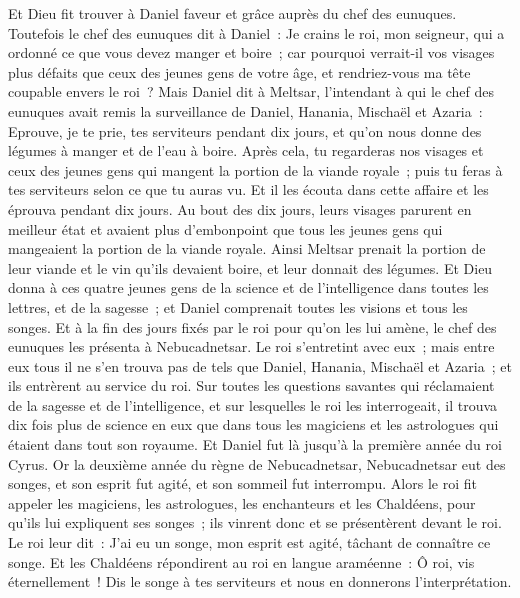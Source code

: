 \begin{multicols}{2}
Et Dieu fit trouver à Daniel faveur et grâce auprès du chef des eunuques. 
Toutefois le chef des eunuques dit à Daniel~: Je crains le roi, mon seigneur, qui a ordonné ce que vous devez manger et boire~; car pourquoi verrait-il vos visages plus défaits que ceux des jeunes gens de votre âge, et rendriez-vous ma tête coupable envers le roi~?
Mais Daniel dit à Meltsar, l'intendant à qui le chef des eunuques avait remis la surveillance de Daniel, Hanania, Mischaël et Azaria~:
Eprouve, je te prie, tes serviteurs pendant dix jours, et qu'on nous donne des légumes à manger et de l'eau à boire.
Après cela, tu regarderas nos visages et ceux des jeunes gens qui mangent la portion de la viande royale~; puis tu feras à tes serviteurs selon ce que tu auras vu.
Et il les écouta dans cette affaire et les éprouva pendant dix jours.
Au bout des dix jours, leurs visages parurent en meilleur état et avaient plus d'embonpoint que tous les jeunes gens qui mangeaient la portion de la viande royale.
 Ainsi Meltsar prenait la portion de leur viande et le vin qu'ils devaient boire, et leur donnait des légumes.
Et Dieu donna à ces quatre jeunes gens de la science et de l'intelligence dans toutes les lettres, et de la sagesse~; et Daniel comprenait toutes les visions et tous les songes.
Et à la fin des jours fixés par le roi pour qu'on les lui amène, le chef des eunuques les présenta à Nebucadnetsar.
Le roi s'entretint avec eux~; mais entre eux tous il ne s'en trouva pas de tels que Daniel, Hanania, Mischaël et Azaria~; et ils entrèrent au service du roi.
Sur toutes les questions savantes qui réclamaient de la sagesse et de l'intelligence, et sur lesquelles le roi les interrogeait, il trouva dix fois plus de science en eux que dans tous les magiciens et les astrologues qui étaient dans tout son royaume.
Et Daniel fut là jusqu'à la première année du roi Cyrus.
\VerseOne{}Or la deuxième année du règne de Nebucadnetsar, Nebucadnetsar eut des songes, et son esprit fut agité, et son sommeil fut interrompu.
Alors le roi fit appeler les magiciens, les astrologues, les enchanteurs et les Chaldéens, pour qu'ils lui expliquent ses songes~; ils vinrent donc et se présentèrent devant le roi.
Le roi leur dit~: J'ai eu un songe, mon esprit est agité, tâchant de connaître ce songe.
Et les Chaldéens répondirent au roi en langue araméenne~: Ô roi, vis éternellement~! Dis le songe à tes serviteurs et nous en donnerons l'interprétation.

\end{multicols}
